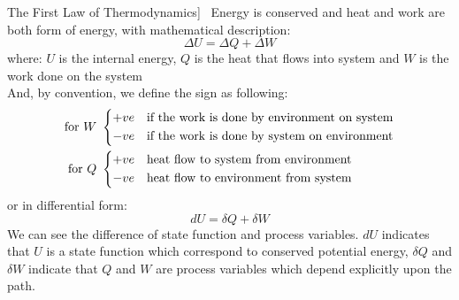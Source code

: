 \documentclass[UTF8]{book}
\newenvironment{theorem}[2][Theorem]{\begin{trivlist}
\item[\hskip \labelsep {\bfseries #1}\hskip \labelsep {\bfseries }]}{\end{trivlist}}
\begin{document}
\begin{theorem}
[The First Law of Thermodynamics]~  {Energy is conserved and heat and work are both form of energy, with mathematical description:}
$$\boxed{\Delta U=\Delta Q+\Delta W}$$
 {where: $U$ is the internal energy, $Q$ is the heat that flows into system and $W$ is the work done on the system}\\
 {And, by convention, we define the sign as following:}
\begin{align*}
 \textrm{for }W\ &
   \begin{dcases}
     +ve \quad  \textrm{if the work is done by environment on system}\\
     -ve \quad  \textrm{if the work is done by system on environment}
   \end{dcases}\\
 \textrm{for }Q\ &
   \begin{dcases}
     +ve \quad  \textrm{heat flow to system from environment}\\
     -ve \quad  \textrm{heat flow to environment from system}
   \end{dcases}
\end{align*}
 {or in differential form:}
$$\boxed{dU=\delta Q+\delta W}$$
 {We can see the difference of state function and process variables. $dU$ indicates that $U$ is a state function which correspond to conserved potential energy, $\delta Q$ and $\delta W$ indicate that $Q$ and $W$ are process variables which depend explicitly upon the path.}
\end{theorem}
\end{document}
